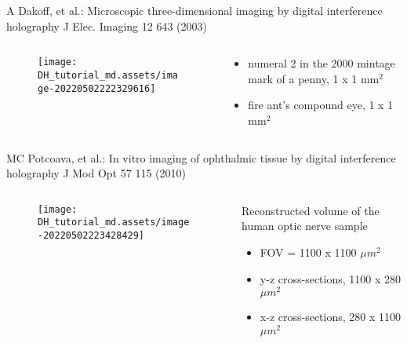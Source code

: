 \documentclass[t, aspectratio=169]{beamer}
\begin{document}
\begin{frame}{A Dakoff, et al.: Microscopic three-dimensional imaging by digital interference holography}
	\vspace{-3 mm}
	\small J Elec. Imaging 12 643 (2003)
	\begin{columns}
		\begin{column}{.6\textwidth}
			\begin{figure}
				\texttt{[image: DH\_tutorial\_md.assets/image-20220502222329616]}
			\end{figure}
		\end{column}
		\begin{column}{.4\textwidth}
			\begin{itemize}
				\item[a) ] numeral 2 in the 2000 mintage mark of a penny, 1 x 1 mm$^2$
				\item[b) ] fire ant's compound eye, 1 x 1 mm$^2$
			\end{itemize}
		\end{column}
	\end{columns}
\end{frame}


\begin{frame}{MC Potcoava, et al.: In vitro imaging of ophthalmic tissue by digital interference holography}
	\vspace{-3 mm}
	\small J Mod Opt 57 115 (2010)
	\begin{columns}
		\begin{column}{.6\textwidth}
			\begin{figure}
				\texttt{[image: DH\_tutorial\_md.assets/image-20220502223428429]}
			\end{figure}
		\end{column}
		\begin{column}{.4\textwidth}
			Reconstructed volume of the human optic nerve sample
			\begin{itemize}
				\item[a) ] FOV = 1100 x 1100 $\mu m^2 $
				\item[b) ] y-z cross-sections, 1100 x 280 $\mu m^2 $
				\item[c) ] x-z cross-sections, 280 x 1100 $\mu m^2 $
			\end{itemize}
		\end{column}
	\end{columns}
\end{frame}
\end{document}
